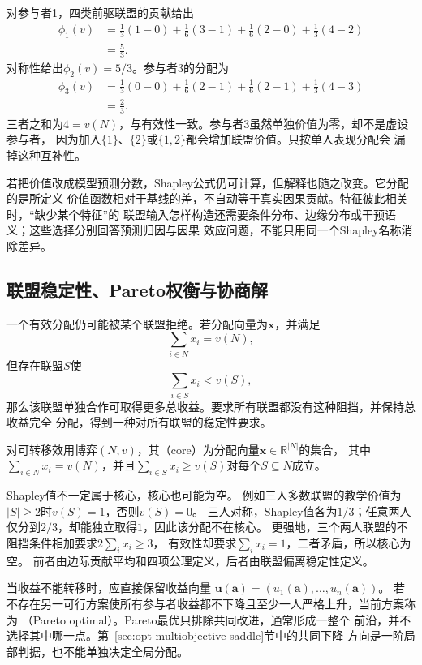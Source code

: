 对参与者1，四类前驱联盟的贡献给出
\begin{align*}
  \phi_1(v)
  &=
  \frac13(1-0)
  +\frac16(3-1)
  +\frac16(2-0)
  +\frac13(4-2)\\
  &=\frac53.
\end{align*}
对称性给出\(\phi_2(v)=5/3\)。参与者3的分配为
\begin{align*}
  \phi_3(v)
  &=
  \frac13(0-0)
  +\frac16(2-1)
  +\frac16(2-1)
  +\frac13(4-3)\\
  &=\frac23.
\end{align*}
三者之和为\(4=v(N)\)，与有效性一致。参与者3虽然单独价值为零，却不是虚设参与者，
因为加入\(\{1\}\)、\(\{2\}\)或\(\{1,2\}\)都会增加联盟价值。只按单人表现分配会
漏掉这种互补性。

若把价值改成模型预测分数，Shapley公式仍可计算，但解释也随之改变。它分配的是所定义
价值函数相对于基线的差，不自动等于真实因果贡献。特征彼此相关时，“缺少某个特征”的
联盟输入怎样构造还需要条件分布、边缘分布或干预语义；这些选择分别回答预测归因与因果
效应问题，不能只用同一个Shapley名称消除差异。

\subsection{联盟稳定性、Pareto权衡与协商解}

一个有效分配仍可能被某个联盟拒绝。若分配向量为\(\bm{x}\)，并满足
\[
  \sum_{i\in N}x_i=v(N),
\]
但存在联盟\(S\)使
\[
  \sum_{i\in S}x_i<v(S),
\]
那么该联盟单独合作可取得更多总收益。要求所有联盟都没有这种阻挡，并保持总收益完全
分配，得到一种对所有联盟的稳定性要求。
\begin{definition}[合作博弈的核心]
\label{def:game-cooperative-core}
对可转移效用博弈$(N,v)$，其（core）为分配向量$\bm x\in\mathbb R^{|N|}$的集合，
其中$\sum_{i\in N}x_i=v(N)$，并且$\sum_{i\in S}x_i\geq v(S)$对每个$S\subseteq N$成立。
\end{definition}
Shapley值不一定属于核心，核心也可能为空。
例如三人多数联盟的教学价值为$|S|\geq2$时$v(S)=1$，否则$v(S)=0$。
三人对称，Shapley值各为$1/3$；任意两人仅分到$2/3$，却能独立取得$1$，因此该分配不在核心。
更强地，三个两人联盟的不阻挡条件相加要求$2\sum_i x_i\geq3$，
有效性却要求$\sum_i x_i=1$，二者矛盾，所以核心为空。
前者由边际贡献平均和四项公理定义，后者由联盟偏离稳定性定义。

当收益不能转移时，应直接保留收益向量
\(\bm{u}(\bm{a})=(u_1(\bm{a}),\ldots,u_n(\bm{a}))\)。
若不存在另一可行方案使所有参与者收益都不下降且至少一人严格上升，当前方案称为
（Pareto optimal）。Pareto最优只排除共同改进，通常形成一整个
前沿，并不选择其中哪一点。第~\ref{sec:opt-multiobjective-saddle}节中的共同下降
方向是一阶局部判据，也不能单独决定全局分配。

